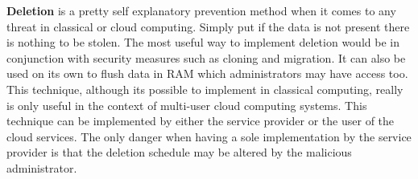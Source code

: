 \label{llDeletion}

\textbf{Deletion} is a pretty self explanatory prevention method when it comes to any threat in classical or cloud computing. Simply put if the data is not present there is nothing to be stolen. \cite{kandias}\cite{subashini} The most useful way to implement deletion would be in conjunction with security measures such as cloning and migration. \cite{szefer} It can also be used on its own to flush data in RAM which administrators may have access too. This technique, although its possible to implement in classical computing, really is only useful in the context of multi-user cloud computing systems. This technique can be implemented by either the service provider or the user of the cloud services. The only danger when having a sole implementation by the service provider is that the deletion schedule may be altered by the malicious administrator. \cite{sabahi}
